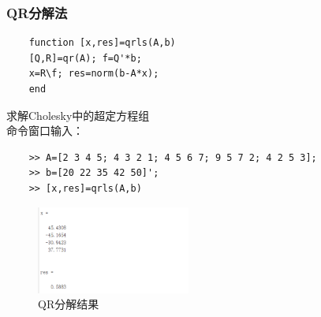 \documentclass[12pt]{article} %
\begin{document}
	\subsubsection{QR分解法}
	\begin{lstlisting}
	function [x,res]=qrls(A,b)
	[Q,R]=qr(A); f=Q'*b;
	x=R\f; res=norm(b-A*x);
	end
	\end{lstlisting}
	\indent 求解Cholesky中的超定方程组\\
	\indent 命令窗口输入：
	\begin{lstlisting}
	>> A=[2 3 4 5; 4 3 2 1; 4 5 6 7; 9 5 7 2; 4 2 5 3];
	>> b=[20 22 35 42 50]';
	>> [x,res]=qrls(A,b)
	\end{lstlisting}
	\begin{figure}[ht]
		\centering
		\includegraphics[width=0.45\textwidth]{qrls.png}
		\caption{QR分解结果}
		\label{fig:fig1}
	\end{figure}
\end{document}
